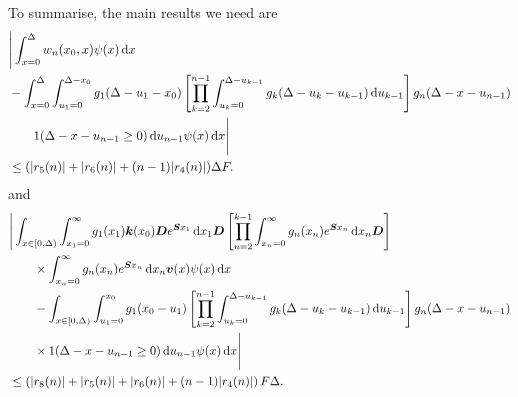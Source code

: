 To summarise, the main results we need are 
\begin{align}
	&\Bigg| \int_{x=0}^\Delta w_n(x_0,x) \psi(x) \wrt x \nonumber 
%
	\\&{}- \int_{x=0}^\Delta \int_{u_1=0}^{\Delta-x_0}g_1(\Delta - u_1 - x_0)
	\left[\prod_{k=2}^{n-1} \int_{u_k=0}^{\Delta-u_{k-1}} g_k(\Delta-u_k-u_{k-1})\wrt u_{k-1}\right] \nonumber 
			g_{n}(\Delta - x-u_{n-1})
\\&\qquad{} 1(\Delta-x-u_{n-1}\geq0) \wrt u_{n-1}\psi(x) \wrt x \Bigg| \nonumber
	\\&\leq (|r_5(n)| + |r_6(n)| + (n-1)|r_4(n)|)\Delta F. \label{eqn: rhs g 4dvfklsmv2}
\end{align}
and 
\begin{align}
	&\Bigg| \int_{x\in[0,\Delta)} \int_{x_1=0}^\infty g_1(x_1) \bs k(x_0) \bs D e^{\bs{S}x_1}\wrt x_1\bs D 
			\left[\prod_{n=2}^{k-1}\int_{x_n=0}^\infty g_n(x_n) e^{\bs{S}x_n} \wrt x_n
	\bs D\right] \nonumber 
			\\&\qquad{}\times\int_{x_n=0}^\infty g_{n}(x_n) e^{\bs{S}x_n} \wrt x_n {\bs v}(x) \psi(x)\wrt x \nonumber 
%
	\\&\qquad {}- \int_{x\in[0,\Delta)} \int_{u_1=0}^{x_0}g_1(x_0 - u_1)
	\left[\prod_{k=2}^{n-1} \int_{u_k=0}^{\Delta-u_{k-1}} g_k(\Delta-u_k-u_{k-1})\wrt u_{k-1}\right] \nonumber 
			g_{n}(\Delta - x-u_{n-1})
\\&\qquad{} \times1(\Delta-x-u_{n-1}\geq0)\wrt u_{n-1}\psi(x)\wrt x \Bigg| \nonumber
	\\&\leq \left(|r_8(n)|+|r_5(n)|+|r_6(n)| + (n-1)|r_4(n)|\right)F\Delta.\label{eqn: KAFnnmna22}
\end{align}

